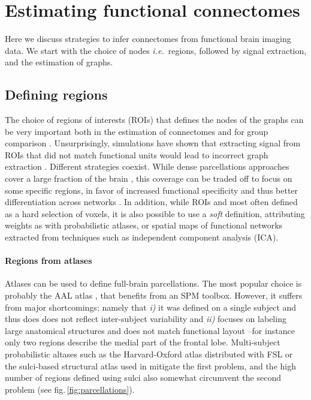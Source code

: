 \documentclass[5p]{elsarticle}
\begin{document}

\section{Estimating functional connectomes}

Here we discuss strategies to infer connectomes from functional brain
imaging data. We start with the choice of nodes \emph{i.e.}\ regions,
followed by signal extraction, and the estimation of graphs.

\subsection{Defining regions}

The choice of regions of interests (ROIs) that defines the nodes of the
graphs can be very important both in the estimation of connectomes and
for group comparison \cite{wang2009}. Unsurprisingly, simulations have
shown that extracting signal from ROIs that did not match functional
units would lead to incorrect graph extraction \cite{smith2011}.
%
Different strategies coexist. While dense parcellations approaches cover
a large fraction of the brain \cite{achard2006, varoquaux2010c,
wang2009}, this coverage can be traded off to focus on some specific
regions, in favor of increased functional specificity and thus better
differentiation across networks \cite{greicius2003, fair2009,
varoquaux2010b, lewis2009, fransson2008, shirer2012}. In addition, while
ROIs and most often defined as a hard selection of voxels, it is also
possible to use a \emph{soft} definition, attributing weights as with
probabilistic atlases, or spatial maps of functional networks extracted
from techniques such as independent component analysis (ICA).


\paragraph{Regions from atlases}
%
Atlases can be used to define full-brain parcellations. The most popular
choice is probably the AAL atlas \cite{tzourio-mazoyer2002a}, that
benefits from an SPM toolbox. However, it suffers from major
shortcomings; namely that \emph{i)} it was defined on a single subject
and thus does does not reflect inter-subject variability and \emph{ii)}
focuses on labeling large anatomical structures and does not match
functional layout --for instance only two regions describe the medial
part of the frontal lobe. Multi-subject probabilistic altases such as the
Harvard-Oxford atlas distributed with FSL \cite{smith2004} or the
sulci-based structural atlas used in \cite{varoquaux2010c} mitigate the
first problem, and the high number of regions defined using sulci also
somewhat circumvent the second problem (see
fig.\,\ref{fig:parcellations}).
\end{document}
